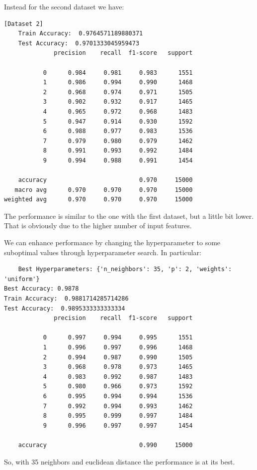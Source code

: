 \documentclass[12pt,a4paper,oneside]{article}
\begin{document}
Instead for the second dataset we have:

\begin{verbatim}[Dataset 2]
    Train Accuracy:  0.9764571189880371
    Test Accuracy:  0.9701333045959473
              precision    recall  f1-score   support

           0      0.984     0.981     0.983      1551
           1      0.986     0.994     0.990      1468
           2      0.968     0.974     0.971      1505
           3      0.902     0.932     0.917      1465
           4      0.965     0.972     0.968      1483
           5      0.947     0.914     0.930      1592
           6      0.988     0.977     0.983      1536
           7      0.979     0.980     0.979      1462
           8      0.991     0.993     0.992      1484
           9      0.994     0.988     0.991      1454

    accuracy                          0.970     15000
   macro avg      0.970     0.970     0.970     15000
weighted avg      0.970     0.970     0.970     15000
\end{verbatim}

The performance is similar to the one with the first dataset, but a little bit
lower. That is obviously due to the higher number of input features. 

We can enhance performance by changing the hyperparameter to some suboptimal
values through hyperparameter search. In particular:

\begin{verbatim}
    Best Hyperparameters: {'n_neighbors': 35, 'p': 2, 'weights': 'uniform'}
Best Accuracy: 0.9878
Train Accuracy:  0.9881714285714286
Test Accuracy:  0.9895333333333334
              precision    recall  f1-score   support

           0      0.997     0.994     0.995      1551
           1      0.996     0.997     0.996      1468
           2      0.994     0.987     0.990      1505
           3      0.968     0.978     0.973      1465
           4      0.983     0.992     0.987      1483
           5      0.980     0.966     0.973      1592
           6      0.995     0.994     0.994      1536
           7      0.992     0.994     0.993      1462
           8      0.995     0.999     0.997      1484
           9      0.996     0.997     0.997      1454

    accuracy                          0.990     15000
\end{verbatim}

So, with 35 neighbors and euclidean distance the performance is at its best.
\end{document}
